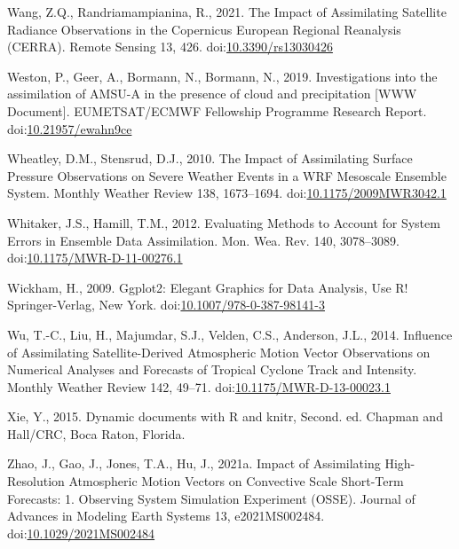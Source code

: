 \documentclass[final,5p,times,twocolumn,authoryear]{elsarticle} %
\begin{document}
\leavevmode\hypertarget{ref-wang2021}{}%
Wang, Z.Q., Randriamampianina, R., 2021. The Impact of Assimilating Satellite Radiance Observations in the Copernicus European Regional Reanalysis (CERRA). Remote Sensing 13, 426. doi:\href{https://doi.org/10.3390/rs13030426}{10.3390/rs13030426}

\leavevmode\hypertarget{ref-weston2019}{}%
Weston, P., Geer, A., Bormann, N., Bormann, N., 2019. Investigations into the assimilation of AMSU-A in the presence of cloud and precipitation {[}WWW Document{]}. EUMETSAT/ECMWF Fellowship Programme Research Report. doi:\href{https://doi.org/10.21957/ewahn9ce}{10.21957/ewahn9ce}

\leavevmode\hypertarget{ref-wheatley2010}{}%
Wheatley, D.M., Stensrud, D.J., 2010. The Impact of Assimilating Surface Pressure Observations on Severe Weather Events in a WRF Mesoscale Ensemble System. Monthly Weather Review 138, 1673--1694. doi:\href{https://doi.org/10.1175/2009MWR3042.1}{10.1175/2009MWR3042.1}

\leavevmode\hypertarget{ref-whitaker2012}{}%
Whitaker, J.S., Hamill, T.M., 2012. Evaluating Methods to Account for System Errors in Ensemble Data Assimilation. Mon. Wea. Rev. 140, 3078--3089. doi:\href{https://doi.org/10.1175/MWR-D-11-00276.1}{10.1175/MWR-D-11-00276.1}

\leavevmode\hypertarget{ref-wickham2009}{}%
Wickham, H., 2009. Ggplot2: Elegant Graphics for Data Analysis, Use R! Springer-Verlag, New York. doi:\href{https://doi.org/10.1007/978-0-387-98141-3}{10.1007/978-0-387-98141-3}

\leavevmode\hypertarget{ref-wu2014}{}%
Wu, T.-C., Liu, H., Majumdar, S.J., Velden, C.S., Anderson, J.L., 2014. Influence of Assimilating Satellite-Derived Atmospheric Motion Vector Observations on Numerical Analyses and Forecasts of Tropical Cyclone Track and Intensity. Monthly Weather Review 142, 49--71. doi:\href{https://doi.org/10.1175/MWR-D-13-00023.1}{10.1175/MWR-D-13-00023.1}

\leavevmode\hypertarget{ref-xie2015}{}%
Xie, Y., 2015. Dynamic documents with R and knitr, Second. ed. Chapman and Hall/CRC, Boca Raton, Florida.

\leavevmode\hypertarget{ref-zhao2021}{}%
Zhao, J., Gao, J., Jones, T.A., Hu, J., 2021a. Impact of Assimilating High-Resolution Atmospheric Motion Vectors on Convective Scale Short-Term Forecasts: 1. Observing System Simulation Experiment (OSSE). Journal of Advances in Modeling Earth Systems 13, e2021MS002484. doi:\href{https://doi.org/10.1029/2021MS002484}{10.1029/2021MS002484}
\end{document}

